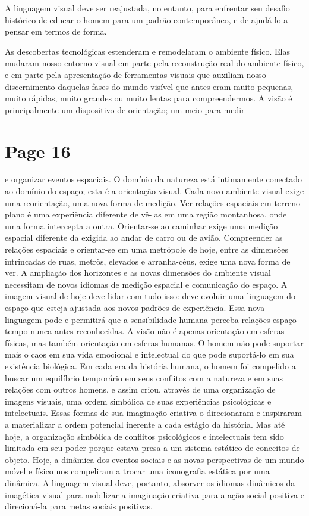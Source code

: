 \documentclass[a4paper]{article}
\begin{document}
A linguagem visual deve ser reajustada, no entanto, para enfrentar seu desafio histórico de educar o homem para um padrão contemporâneo, e de ajudá-lo a pensar em termos de forma.

As descobertas tecnológicas estenderam e remodelaram o ambiente físico. Elas mudaram nosso entorno visual em parte pela reconstrução real do ambiente físico, e em parte pela apresentação de ferramentas visuais que auxiliam nosso discernimento daquelas fases do mundo visível que antes eram muito pequenas, muito rápidas, muito grandes ou muito lentas para compreendermos. A visão é principalmente um dispositivo de orientação; um meio para medir--

\newpage
\section*{Page 16}

e organizar eventos espaciais. O domínio da natureza está intimamente conectado ao domínio do espaço; esta é a orientação visual. Cada novo ambiente visual exige uma reorientação, uma nova forma de medição. Ver relações espaciais em terreno plano é uma experiência diferente de vê-las em uma região montanhosa, onde uma forma intercepta a outra. Orientar-se ao caminhar exige uma medição espacial diferente da exigida ao andar de carro ou de avião. Compreender as relações espaciais e orientar-se em uma metrópole de hoje, entre as dimensões intrincadas de ruas, metrôs, elevados e arranha-céus, exige uma nova forma de ver. A ampliação dos horizontes e as novas dimensões do ambiente visual necessitam de novos idiomas de medição espacial e comunicação do espaço. A imagem visual de hoje deve lidar com tudo isso: deve evoluir uma linguagem do espaço que esteja ajustada aos novos padrões de experiência. Essa nova linguagem pode e permitirá que a sensibilidade humana perceba relações espaço-tempo nunca antes reconhecidas. A visão não é apenas orientação em esferas físicas, mas também orientação em esferas humanas. O homem não pode suportar mais o caos em sua vida emocional e intelectual do que pode suportá-lo em sua existência biológica. Em cada era da história humana, o homem foi compelido a buscar um equilíbrio temporário em seus conflitos com a natureza e em suas relações com outros homens, e assim criou, através de uma organização de imagens visuais, uma ordem simbólica de suas experiências psicológicas e intelectuais. Essas formas de sua imaginação criativa o direcionaram e inspiraram a materializar a ordem potencial inerente a cada estágio da história. Mas até hoje, a organização simbólica de conflitos psicológicos e intelectuais tem sido limitada em seu poder porque estava presa a um sistema estático de conceitos de objeto. Hoje, a dinâmica dos eventos sociais e as novas perspectivas de um mundo móvel e físico nos compeliram a trocar uma iconografia estática por uma dinâmica. A linguagem visual deve, portanto, absorver os idiomas dinâmicos da imagética visual para mobilizar a imaginação criativa para a ação social positiva e direcioná-la para metas sociais positivas.
\end{document}
